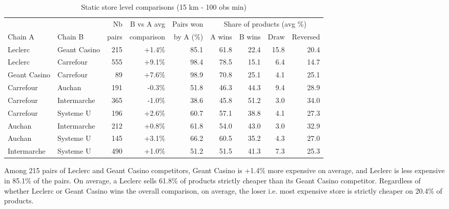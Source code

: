 \documentclass[english]{article}
\begin{document}
\begin{table}[H]
\begin{threeparttable}
\renewcommand{\arraystretch}{0.7}%
\caption{Static store level comparisons (15 km - 100 obs min)
}\label{tab:static_compa_15km}
\small
\begin{tabular}{llrrrrrrr}
\toprule
\toprule
    \textbf{} &       & Nb    & B vs A avg & Pairs won & \multicolumn{4}{c}{Share of products (avg \%)} \\
    Chain A & Chain B & pairs & comparison & by A (\%) & A wins & B wins & Draw & Reversed \\
\midrule
    Leclerc & Geant Casino & 215   & +1.4\% & 85.1  & 61.8  & 22.4  & 15.8  & 20.4 \\
    Leclerc & Carrefour & 555   & +9.1\% & 98.4  & 78.5  & 15.1  & 6.4   & 14.7 \\
    Geant Casino & Carrefour & 89    & +7.6\% & 98.9  & 70.8  & 25.1  & 4.1   & 25.1 \\
    Carrefour & Auchan & 191   & -0.3\% & 51.8  & 46.3  & 44.3  & 9.4   & 28.9 \\
    Carrefour & Intermarche & 365   & -1.0\% & 38.6  & 45.8  & 51.2  & 3.0   & 34.0 \\
    Carrefour & Systeme U & 196   & +2.6\% & 60.7  & 57.1  & 38.8  & 4.1   & 27.3 \\
    Auchan & Intermarche & 212   & +0.8\% & 61.8  & 54.0  & 43.0  & 3.0   & 32.9 \\
    Auchan & Systeme U & 145   & +3.1\% & 66.2  & 60.5  & 35.2  & 4.3   & 27.0 \\
    Intermarche & Systeme U & 490   & +1.0\% & 51.2  & 51.5  & 41.3  & 7.3   & 25.3 \\
\bottomrule
\bottomrule
\end{tabular}
\begin{tablenotes}
      \small
      \item Among 215 pairs of Leclerc and Geant Casino competitors, Geant Casino is +1.4\% more expensive on average, and Leclerc is less expensive in 85.1\% of the pairs. On average, a Leclerc sells 61.8\% of products strictly cheaper than its Geant Casino competitor. Regardless of whether Leclerc or Geant Casino wins the overall comparison, on average, the loser i.e. most expensive store is strictly cheaper on 20.4\% of products.
\end{tablenotes}
\end{threeparttable}
\end{table}
\end{document}
